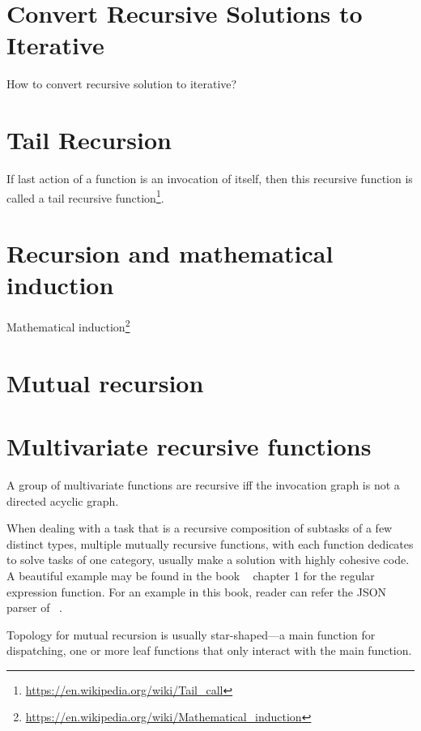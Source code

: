 \section{Convert Recursive Solutions to Iterative}\label{sec:recursiveToIterative}

How to convert recursive solution to iterative?

\section{Tail Recursion}\label{sec:tailRecursion}

If last action of a function is an invocation of itself, then this recursive function is called a
tail recursive function\footnote{\url{https://en.wikipedia.org/wiki/Tail_call}}.

\section{Recursion and mathematical induction}\label{sec:recursionMathematicalInduction}

Mathematical induction\footnote{\url{https://en.wikipedia.org/wiki/Mathematical_induction}}

\section{Mutual recursion}\label{sec:mutual-recursion}

\section{Multivariate recursive functions}\label{sec:multivariateRecursiveFunctions}
\begin{defn}
    A group of multivariate functions are recursive iff the invocation graph is not a directed
    acyclic graph.
\end{defn}

When dealing with a task that is a recursive composition of subtasks of a few
distinct types, multiple mutually recursive functions,
with each function dedicates to solve tasks of one category,
usually make a solution with highly cohesive code.
A beautiful example may be found in the book ~\cite{Beautiful-Code:2007} chapter 1 for the regular
expression  function.
For an example in this book, reader can refer the JSON parser of ~.

Topology for mutual recursion is usually star-shaped---a main function for dispatching,
one or more leaf functions that only interact with the main function.


